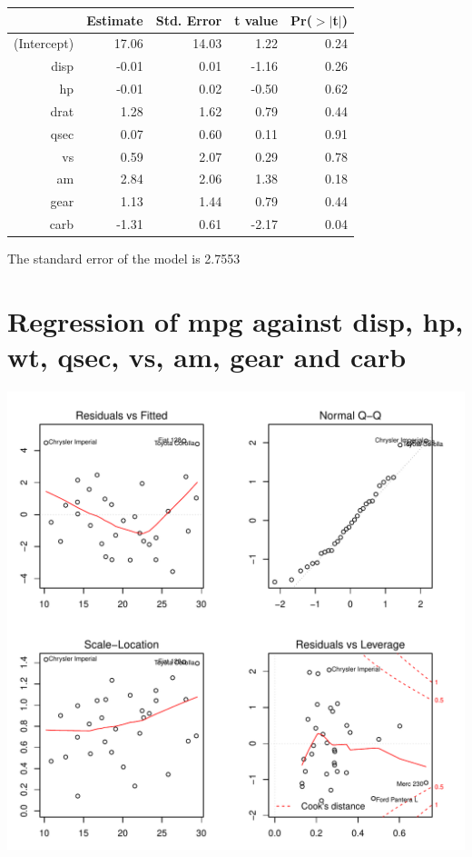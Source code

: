 \documentclass{article}\usepackage[]{graphicx}\usepackage[]{color}
\makeatletter
\def\maxwidth{ %
  \ifdim\Gin@nat@width>\linewidth
    \linewidth
  \else
    \Gin@nat@width
  \fi
}
\newenvironment{knitrout}{}{} %
\makeatother
\begin{document}
\begin{table}[ht]
\centering
\begin{tabular}{rrrrr}
  \hline
 & Estimate & Std. Error & t value & Pr($>$$|$t$|$) \\ 
  \hline
(Intercept) & 17.06 & 14.03 & 1.22 & 0.24 \\ 
  disp & -0.01 & 0.01 & -1.16 & 0.26 \\ 
  hp & -0.01 & 0.02 & -0.50 & 0.62 \\ 
  drat & 1.28 & 1.62 & 0.79 & 0.44 \\ 
  qsec & 0.07 & 0.60 & 0.11 & 0.91 \\ 
  vs & 0.59 & 2.07 & 0.29 & 0.78 \\ 
  am & 2.84 & 2.06 & 1.38 & 0.18 \\ 
  gear & 1.13 & 1.44 & 0.79 & 0.44 \\ 
  carb & -1.31 & 0.61 & -2.17 & 0.04 \\ 
   \hline
\end{tabular}
\end{table}




The standard error of the model is 2.7553

\newpage

\section{Regression of mpg against disp, hp, wt, qsec, vs, am, gear and carb }
\begin{knitrout}
\color{fgcolor}

{\centering \includegraphics[width=\maxwidth]{figure/lm-disp-hp-wt-qsec-vs-am-gear-carb} 

}



\end{knitrout}
\end{document}
